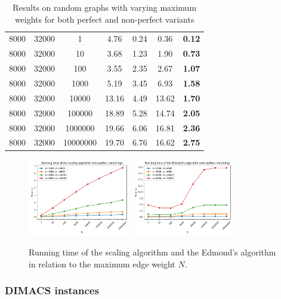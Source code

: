 \begin{table}
\begin{tabular}{
ccc|cc|cc}
\hline
8000 & 32000 & 1 & 4.76 & 0.24 & 0.36 & \textbf{0.12} \\
8000 & 32000 & 10 & 3.68 & 1.23 & 1.90 & \textbf{0.73} \\
8000 & 32000 & 100 & 3.55 & 2.35 & 2.67 & \textbf{1.07} \\
8000 & 32000 & 1000 & 5.19 & 3.45 & 6.93 & \textbf{1.58} \\
8000 & 32000 & 10000 & 13.16 & 4.49 & 13.62 & \textbf{1.70} \\
8000 & 32000 & 100000 & 18.89 & 5.28 & 14.74 & \textbf{2.05} \\
8000 & 32000 & 1000000 & 19.66 & 6.06 & 16.81 & \textbf{2.36} \\
8000 & 32000 & 10000000 & 19.70 & 6.76 & 16.62 & \textbf{2.75} \\
\end{tabular}
\caption{Results on random graphs with varying maximum weights for both perfect and non-perfect variants}\label{tab:weight}
\end{table}

\begin{figure}[b]
    \centering
    \includegraphics*[width=0.4\textwidth]{figures/Nweight.png}
    \includegraphics*[width=0.4\textwidth]{figures/Eweight.png}
    \caption{Running time of the scaling algorithm and the Edmond's algorithm in relation to the maximum edge weight $N$.}\label{fig:weight}
\end{figure}

\subsubsection*{DIMACS instances}

